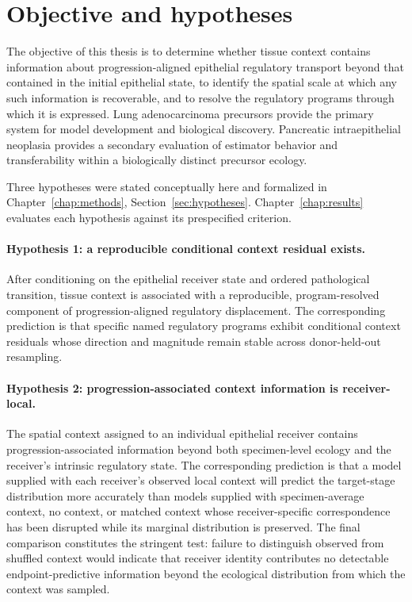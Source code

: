 \section{Objective and hypotheses}
\label{sec:intro-objective}

The objective of this thesis is to determine whether tissue context contains
information about progression-aligned epithelial regulatory transport beyond
that contained in the initial epithelial state, to identify the spatial scale
at which any such information is recoverable, and to resolve the regulatory
programs through which it is expressed. Lung adenocarcinoma precursors
provide the primary system for model development and biological discovery.
Pancreatic intraepithelial neoplasia provides a secondary evaluation of
estimator behavior and transferability within a biologically distinct
precursor ecology.

Three hypotheses were stated conceptually here and formalized in
Chapter~\ref{chap:methods}, Section~\ref{sec:hypotheses}. Chapter~\ref{chap:results}
evaluates each hypothesis against its prespecified criterion.

\paragraph{Hypothesis 1: a reproducible conditional context residual exists.}
After conditioning on the epithelial receiver state and ordered pathological
transition, tissue context is associated with a reproducible, program-resolved
component of progression-aligned regulatory displacement. The corresponding
prediction is that specific named regulatory programs exhibit conditional
context residuals whose direction and magnitude remain stable across
donor-held-out resampling.

\paragraph{Hypothesis 2: progression-associated context information is
receiver-local.}
The spatial context assigned to an individual epithelial receiver contains
progression-associated information beyond both specimen-level ecology and the
receiver's intrinsic regulatory state. The corresponding prediction is that a
model supplied with each receiver's observed local context will predict the
target-stage distribution more accurately than models supplied with
specimen-average context, no context, or matched context whose
receiver-specific correspondence has been disrupted while its marginal
distribution is preserved. The final comparison constitutes the stringent
test: failure to distinguish observed from shuffled context would indicate
that receiver identity contributes no detectable endpoint-predictive
information beyond the ecological distribution from which the context was
sampled.

